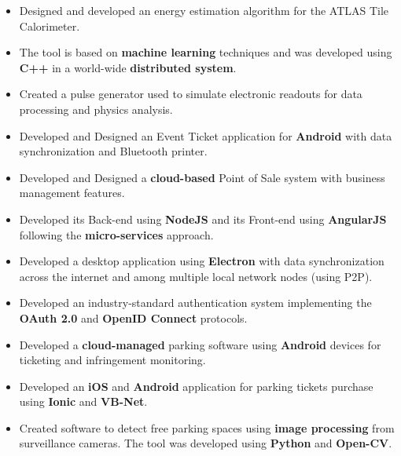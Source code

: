 \documentclass[10pt,a4paper,ragged2e]{altacv}
\begin{document}

\begin{itemize}
	\item Designed and developed an energy estimation algorithm for the ATLAS Tile Calorimeter.
	\item The tool is based on \textbf{machine learning} techniques and was developed using \textbf{C++} in a world-wide \textbf{distributed system}.
	\item Created a pulse generator used to simulate electronic readouts for data processing and physics analysis.
\end{itemize}

\divider%

\begin{itemize}
\item Developed and Designed an Event Ticket application for \textbf{Android} with data synchronization and Bluetooth printer.
\item Developed and Designed a \textbf{cloud-based} Point of Sale system with business management features.
\item Developed its Back-end using \textbf{NodeJS} and its Front-end using \textbf{AngularJS} following the \textbf{micro-services} approach.
\item Developed a desktop application using \textbf{Electron} with data synchronization across the internet and among multiple local network nodes (using P2P).
\item Developed an industry-standard authentication system implementing the \textbf{OAuth 2.0} and \textbf{OpenID Connect} protocols.
\end{itemize}

\divider%

\begin{itemize}
\item Developed a \textbf{cloud-managed} parking software using \textbf{Android} devices for ticketing and infringement monitoring.  
\item Developed an \textbf{iOS} and \textbf{Android} application for parking tickets purchase using \textbf{Ionic} and \textbf{VB-Net}.
\item Created software to detect free parking spaces using \textbf{image processing} from surveillance cameras. The tool was developed using \textbf{Python} and \textbf{Open-CV}\@.
\end{itemize}
\end{document}
